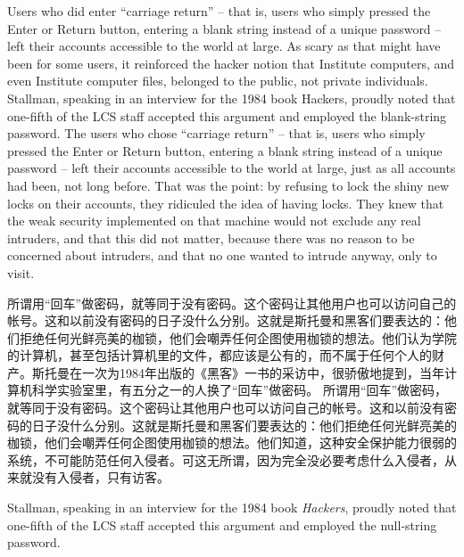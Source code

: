 \ifdefined\eng
\ifdefined\vone
Users who did enter ``carriage return'' -- that is, users who simply pressed the Enter or Return button, entering a blank string instead of a unique password -- left their accounts accessible to the world at large. As scary as that might have been for some users, it reinforced the hacker notion that Institute computers, and even Institute computer files, belonged to the public, not private individuals. Stallman, speaking in an interview for the 1984 book Hackers, proudly noted that one-fifth of the LCS staff accepted this argument and employed the blank-string password.
\fi
\ifdefined\vtwo
The users who chose ``carriage return'' -- that is, users who simply pressed the Enter or Return button, entering a blank string instead of a unique password -- left their accounts accessible to the world at large, just as all accounts had been, not long before. That was the point: by refusing to lock the shiny new locks on their accounts, they ridiculed the idea of having locks. They knew that the weak security implemented on that machine would not exclude any real intruders, and that this did not matter, because there was no reason to be concerned about intruders, and that no one wanted to intrude anyway, only to visit.
\fi
\fi

\ifdefined\chs
\ifdefined\vone
所谓用``回车''做密码，就等同于没有密码。这个密码让其他用户也可以访问自己的帐号。这和以前没有密码的日子没什么分别。这就是斯托曼和黑客们要表达的：他们拒绝任何光鲜亮美的枷锁，他们会嘲弄任何企图使用枷锁的想法。他们认为学院的计算机，甚至包括计算机里的文件，都应该是公有的，而不属于任何个人的财产。斯托曼在一次为1984年出版的《黑客》一书的采访中，很骄傲地提到，当年计算机科学实验室里，有五分之一的人换了``回车''做密码。
\fi
\ifdefined\vtwo
所谓用``回车''做密码，就等同于没有密码。这个密码让其他用户也可以访问自己的帐号。这和以前没有密码的日子没什么分别。这就是斯托曼和黑客们要表达的：他们拒绝任何光鲜亮美的枷锁，他们会嘲弄任何企图使用枷锁的想法。他们知道，这种安全保护能力很弱的系统，不可能防范任何入侵者。可这无所谓，因为完全没必要考虑什么入侵者，从来就没有入侵者，只有访客。
\fi
\fi

\ifdefined\vtwo
\ifdefined\eng
Stallman, speaking in an interview for the 1984 book \textit{Hackers}, proudly noted that one-fifth of the LCS staff accepted this argument and employed the null-string password.
\fi

